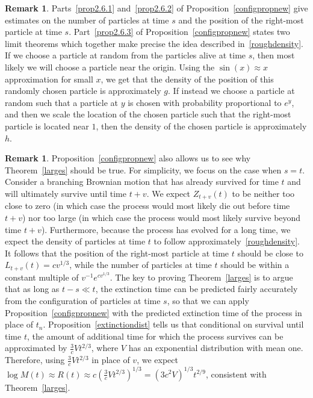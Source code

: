 \documentclass[10pt]{amsart}
\theoremstyle{definition}\newtheorem{defi}[theo]{Definition}\newtheorem{rema}[theo]{Remark}\newtheorem{exam}[theo]{Example}\newtheorem{exem}[theo]{Example}\newtheorem{nota}[theo]{Notation}
\newcommand{\1} {\mathds{1}}
\begin{document}
\begin{rema}
Parts~\eqref{prop2.6.1} and~\eqref{prop2.6.2} of Proposition~\ref{configpropnew} give estimates on the number of particles at time $s$ and the position of the right-most particle at time $s$. Part~\eqref{prop2.6.3} of Proposition~\ref{configpropnew} states two limit theorems which together make precise the idea described in~\eqref{roughdensity}. If we choose a particle at random from the particles alive at time $s$, then most likely we will choose a particle near the origin. Using the $\sin(x) \approx x$ approximation for small $x$, we get that the density of the position of this randomly chosen particle is approximately $g$. If instead we choose a particle at random such that a particle at $y$ is chosen with probability proportional to $e^y$, and then we scale the location of the chosen particle such that the right-most particle is located near $1$, then the density of the chosen particle is approximately $h$.
\end{rema}

\begin{rema}
Proposition~\ref{configpropnew} also allows us to see why Theorem~\ref{larges} should be true. For simplicity, we focus on the case when $s = t$. Consider a branching Brownian motion that has already survived for time $t$ and will ultimately survive until time $t + v$. We expect $Z_{t+v}(t)$ to be neither too close to zero (in which case the process would most likely die out before time $t + v$) nor too large (in which case the process would most likely survive beyond time $t + v$). Furthermore, because the process has evolved for a long time, we expect the density of particles at time $t$ to follow approximately~\eqref{roughdensity}. It follows that the position of the right-most particle at time $t$ should be close to $L_{t+v}(t) = cv^{1/3}$, while the number of particles at time $t$ should be within a constant multiple of $v^{-1} e^{cv^{1/3}}$. The key to proving Theorem~\ref{larges} is to argue that as long as $t - s \ll t$, the extinction time can be predicted fairly accurately from the configuration of particles at time $s$, so that we can apply Proposition~\ref{configpropnew} with the predicted extinction time of the process in place of $t_n$. Proposition~\ref{extinctiondist} tells us that conditional on survival until time $t$, the amount of additional time for which the process survives can be approximated by $\frac{3}{c}V t^{2/3}$, where $V$ has an exponential distribution with mean one. Therefore, using $\frac{3}{c}Vt^{2/3}$ in place of $v$, we expect $\log M(t) \approx R(t) \approx c(\frac{3}{c} V t^{2/3})^{1/3} = (3c^2 V)^{1/3} t^{2/9}$, consistent with Theorem~\ref{larges}.
\end{rema}
\end{document}
